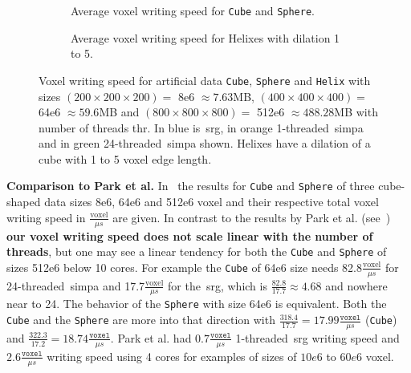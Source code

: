 \documentclass{article}
\begin{document}
\begin{figure}[h]
\centering
  \begin{subfigure}[t]{0.5\textwidth}
  \vskip 0pt
    \caption{Average voxel writing speed for \texttt{Cube} and \texttt{Sphere}.}\label{fig:cubesphere}
  \end{subfigure}%
  \begin{subfigure}[t]{0.5\textwidth}
  \vskip 0pt
    \caption{Average voxel writing speed for Helixes with dilation 1 to 5.}\label{fig:helix}
  \end{subfigure}%
  \caption{Voxel writing speed for artificial data \texttt{Cube}, \texttt{Sphere} and \texttt{Helix} with sizes $(200\times 200\times 200)=$ 8e6 $\approx 7.63$MB, $(400\times 400\times 400)=$ 64e6 $\approx 59.6$MB and $(800\times 800\times 800)=$ 512e6 $\approx 488.28$MB with number of threads thr. In blue is~\ac{srg}, in orange 1-threaded~\ac{simpa} and in green 24-threaded~\ac{simpa} shown. Helixes have a dilation of a cube with 1 to 5 voxel edge length.}\label{fig:exartificial}%
\end{figure}
\textbf{Comparison to Park et al.}
In~ the results for \texttt{Cube} and \texttt{Sphere} of three cube-shaped data sizes 8e6, 64e6 and 512e6 voxel and their respective total voxel writing speed in $\frac{\text{voxel}}{\mu s}$ are given.
In contrast to the results by Park et al. (see~) \textbf{our voxel writing speed does not scale linear with the number of threads}, but one may see a linear tendency for both the \texttt{Cube} and \texttt{Sphere} of sizes 512e6 below 10 cores.
For example the \texttt{Cube} of 64e6 size needs 82.8$\frac{\text{voxel}}{\mu s}$ for 24-threaded~\ac{simpa} and 17.7$\frac{\text{voxel}}{\mu s}$ for the~\ac{srg}, which is $\frac{82.8}{17.7}\approx 4.68$ and nowhere near to 24.
The behavior of the \texttt{Sphere} with size 64e6 is equivalent.
Both the \texttt{Cube} and the \texttt{Sphere} are more into that direction with $\frac{318.4}{17.7}=17.99\frac{\texttt{voxel}}{\mu s}$ (\texttt{Cube}) and $\frac{322.3}{17.2}=18.74\frac{\texttt{voxel}}{\mu s}$.
Park et al. had $0.7 \frac{\texttt{voxel}}{\mu s}$ 1-threaded~\ac{srg} writing speed and $2.6 \frac{\texttt{voxel}}{\mu s}$ writing speed using 4 cores for examples of sizes of $10e6$ to $60e6$ voxel.
\end{document}
